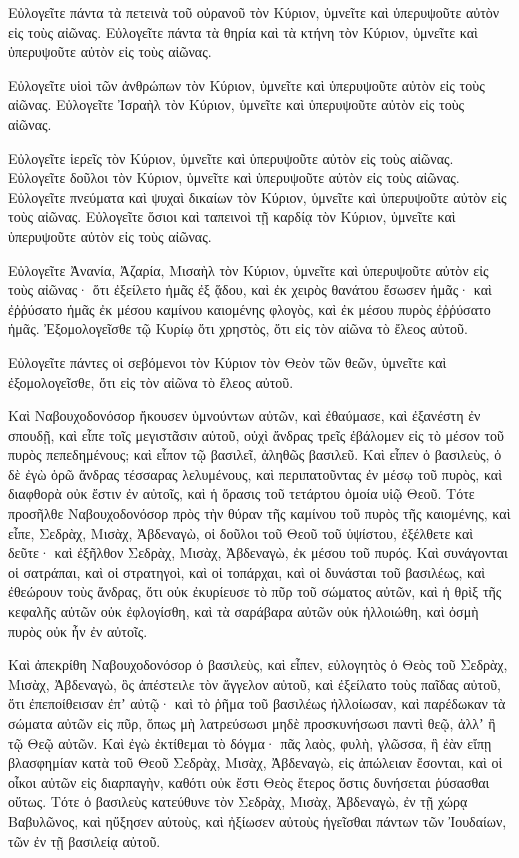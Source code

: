 {Εὐλογεῖτε πάντα τὰ πετεινὰ τοῦ οὐρανοῦ τὸν Κύριον, ὑμνεῖτε καὶ ὑπερυψοῦτε αὐτὸν εἰς τοὺς αἰῶνας.
Εὐλογεῖτε πάντα τὰ θηρία καὶ τὰ κτήνη τὸν Κύριον, ὑμνεῖτε καὶ ὑπερυψοῦτε αὐτὸν εἰς τοὺς αἰῶνας.
\par }{\PP {}Εὐλογεῖτε υἱοὶ τῶν ἀνθρώπων τὸν Κύριον, ὑμνεῖτε καὶ ὑπερυψοῦτε αὐτὸν εἰς τοὺς αἰῶνας.
Εὐλογεῖτε Ἰσραὴλ τὸν Κύριον, ὑμνεῖτε καὶ ὑπερυψοῦτε αὐτὸν εἰς τοὺς αἰῶνας.
\par }{\PP {}Εὐλογεῖτε ἱερεῖς τὸν Κύριον, ὑμνεῖτε καὶ ὑπερυψοῦτε αὐτὸν εἰς τοὺς αἰῶνας.
Εὐλογεῖτε δοῦλοι τὸν Κύριον, ὑμνεῖτε καὶ ὑπερυψοῦτε αὐτὸν εἰς τοὺς αἰῶνας.
Εὐλογεῖτε πνεύματα καὶ ψυχαὶ δικαίων τὸν Κύριον, ὑμνεῖτε καὶ ὑπερυψοῦτε αὐτὸν εἰς τοὺς αἰῶνας.
Εὐλογεῖτε ὅσιοι καὶ ταπεινοὶ τῇ καρδίᾳ τὸν Κύριον, ὑμνεῖτε καὶ ὑπερυψοῦτε αὐτὸν εἰς τοὺς αἰῶνας.
\par }{\PP {}Εὐλογεῖτε Ἀνανία, Ἀζαρία, Μισαὴλ τὸν Κύριον, ὑμνεῖτε καὶ ὑπερυψοῦτε αὐτὸν εἰς τοὺς αἰῶνας· ὅτι ἐξείλετο ἡμᾶς ἐξ ᾅδου, καὶ ἐκ χειρὸς θανάτου ἔσωσεν ἡμᾶς· καὶ ἐῤῥύσατο ἡμᾶς ἐκ μέσου καμίνου καιομένης φλογὸς, καὶ ἐκ μέσου πυρὸς ἐῤῥύσατο ἡμᾶς.
Ἐξομολογεῖσθε τῷ Κυρίῳ ὅτι χρηστὸς, ὅτι εἰς τὸν αἰῶνα τὸ ἔλεος αὐτοῦ.
\par }{\PP {}Εὐλογεῖτε πάντες οἱ σεβόμενοι τὸν Κύριον τὸν Θεὸν τῶν θεῶν, ὑμνεῖτε καὶ ἐξομολογεῖσθε, ὅτι εἰς τὸν αἰῶνα τὸ ἔλεος αὐτοῦ.
\par }{\PP {}Καὶ Ναβουχοδονόσορ ἤκουσεν ὑμνούντων αὐτῶν, καὶ ἐθαύμασε, καὶ ἐξανέστη ἐν σπουδῇ, καὶ εἶπε τοῖς μεγιστᾶσιν αὐτοῦ, οὐχὶ ἄνδρας τρεῖς ἐβάλομεν εἰς τὸ μέσον τοῦ πυρὸς πεπεδημένους; καὶ εἶπον τῷ βασιλεῖ, ἀληθῶς βασιλεῦ.
Καὶ εἶπεν ὁ βασιλεὺς, ὁ δὲ ἐγὼ ὁρῶ ἄνδρας τέσσαρας λελυμένους, καὶ περιπατοῦντας ἐν μέσῳ τοῦ πυρὸς, καὶ διαφθορὰ οὐκ ἔστιν ἐν αὐτοῖς, καὶ ἡ ὅρασις τοῦ τετάρτου ὁμοία υἱῷ Θεοῦ.
Τότε προσῆλθε Ναβουχοδονόσορ πρὸς τὴν θύραν τῆς καμίνου τοῦ πυρὸς τῆς καιομένης, καὶ εἶπε, Σεδρὰχ, Μισὰχ, Ἀβδεναγὼ, οἱ δοῦλοι τοῦ Θεοῦ τοῦ ὑψίστου, ἐξέλθετε καὶ δεῦτε· καὶ ἐξῆλθον Σεδρὰχ, Μισὰχ, Ἀβδεναγὼ, ἐκ μέσου τοῦ πυρός.
Καὶ συνάγονται οἱ σατράπαι, καὶ οἱ στρατηγοὶ, καὶ οἱ τοπάρχαι, καὶ οἱ δυνάσται τοῦ βασιλέως, καὶ ἐθεώρουν τοὺς ἄνδρας, ὅτι οὐκ ἐκυρίευσε τὸ πῦρ τοῦ σώματος αὐτῶν, καὶ ἡ θρὶξ τῆς κεφαλῆς αὐτῶν οὐκ ἐφλογίσθη, καὶ τὰ σαράβαρα αὐτῶν οὐκ ἠλλοιώθη, καὶ ὀσμὴ πυρὸς οὐκ ἦν ἐν αὐτοῖς.
\par }{\PP {}Καὶ ἀπεκρίθη Ναβουχοδονόσορ ὁ βασιλεὺς, καὶ εἶπεν, εὐλογητὸς ὁ Θεὸς τοῦ Σεδρὰχ, Μισὰχ, Ἀβδεναγὼ, ὃς ἀπέστειλε τὸν ἄγγελον αὐτοῦ, καὶ ἐξείλατο τοὺς παῖδας αὐτοῦ, ὅτι ἐπεποίθεισαν ἐπʼ αὐτῷ· καὶ τὸ ῥῆμα τοῦ βασιλέως ἠλλοίωσαν, καὶ παρέδωκαν τὰ σώματα αὐτῶν εἰς πῦρ, ὅπως μὴ λατρεύσωσι μηδὲ προσκυνήσωσι παντὶ θεῷ, ἀλλʼ ἢ τῷ Θεῷ αὐτῶν.
Καὶ ἐγὼ ἐκτίθεμαι τὸ δόγμα· πᾶς λαὸς, φυλὴ, γλῶσσα, ἣ ἐὰν εἴπῃ βλασφημίαν κατὰ τοῦ Θεοῦ Σεδρὰχ, Μισὰχ, Ἀβδεναγὼ, εἰς ἀπώλειαν ἔσονται, καὶ οἱ οἶκοι αὐτῶν εἰς διαρπαγὴν, καθότι οὐκ ἔστι Θεὸς ἕτερος ὅστις δυνήσεται ῥύσασθαι οὕτως.
Τότε ὁ βασιλεὺς κατεύθυνε τὸν Σεδρὰχ, Μισὰχ, Ἀβδεναγὼ, ἐν τῇ χώρᾳ Βαβυλῶνος, καὶ ηὔξησεν αὐτοὺς, καὶ ἠξίωσεν αὐτοὺς ἡγεῖσθαι πάντων τῶν Ἰουδαίων, τῶν ἐν τῇ βασιλείᾳ αὐτοῦ.

}
